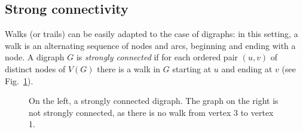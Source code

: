 \documentclass[a4paper]{book}
\theoremstyle{changebreak}                %
\begin{document}
\subsection{Strong connectivity}
Walks (or trails) can be easily adapted to the case of digraphs: in
this setting, a walk is an alternating sequence of nodes
and arcs, beginning and ending with a node. A digraph $G$ is {\it
  strongly connected} if for each ordered pair $(u,v)$ of distinct nodes of
$V(G)$ there is a walk in $G$ starting at $u$ and ending at $v$ (see
Fig.~\ref{f:strongc}).
\begin{figure}[!ht]
\begin{center}
\begin{minipage}{5cm}
\end{minipage}
\hspace*{1cm}
\begin{minipage}{5cm}
\end{minipage}
\end{center}
\caption{On the left, a strongly connected digraph. The graph on the
  right is not strongly connected, as there is no walk from vertex 3
  to vertex 1.}
\label{f:strongc}
\end{figure}
\end{document}
